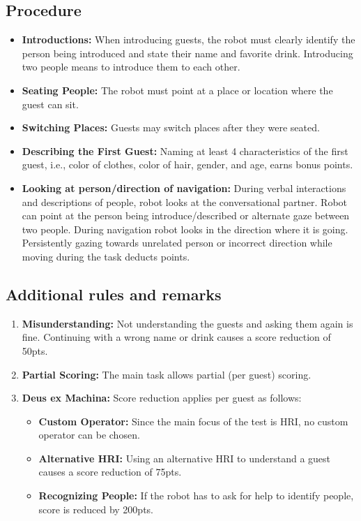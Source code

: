 \subsection*{Procedure}
\begin{itemize}
    \item \textbf{Introductions:} When introducing guests, the robot must clearly identify the person being introduced and state their name and favorite drink. Introducing two people means to introduce them to each other.
	
	\item \textbf{Seating People:} The robot must point at a place or location where the guest can sit.
	
	\item \textbf{Switching Places:} Guests may switch places after they were seated.
	
	\item \textbf{Describing the First Guest:} Naming at least 4 characteristics of the first guest, i.e., color of clothes, color of hair, gender, and age, earns bonus points.
	\item \textbf{Looking at person/direction of navigation:} During verbal interactions and descriptions of people, robot 
	looks at the conversational partner. Robot can point at the person being introduce/described or alternate gaze between two people. During navigation robot looks in the direction where it is going. Persistently gazing towards unrelated 
	person or incorrect direction while moving during the task deducts points. 
\end{itemize}

\subsection*{Additional rules and remarks}
\begin{enumerate}[nosep]
	\item \textbf{Misunderstanding:} Not understanding the guests and asking them again is fine. Continuing with a wrong name or drink causes a score reduction of 50pts.
		
	\item \textbf{Partial Scoring:} The main task allows partial (per guest) scoring.
	
	\item \textbf{Deus ex Machina:} Score reduction applies per guest as follows:
	\begin{itemize}[nosep]
		\item \textbf{Custom Operator:} Since the main focus of the test is HRI, no custom operator can be chosen.
		\item \textbf{Alternative HRI:} Using an alternative HRI to understand a guest causes a score reduction of 75pts.
		\item \textbf{Recognizing People:} If the robot has to ask for help to identify people, score is reduced by 200pts. 
	\end{itemize}
\end{enumerate}


